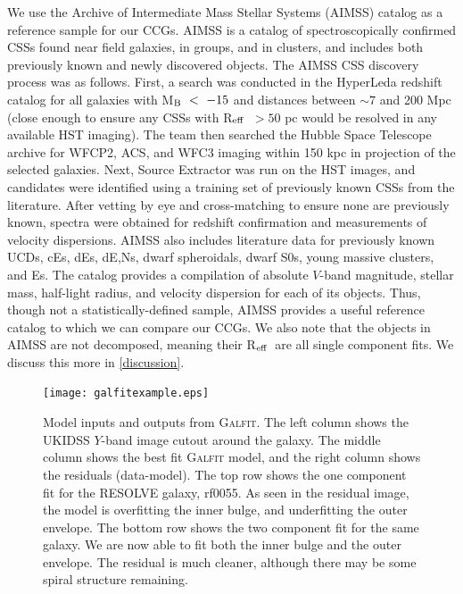 \documentclass[iop,apj]{emulateapj}
\newcommand{\Reff}{R$_{\rm eff}$}
\begin{document}
  We use the Archive of Intermediate Mass Stellar Systems (AIMSS) catalog \citep{Norris2014,Forbes2014,Janz2015} as a reference sample for our CCGs.  AIMSS is a catalog of spectroscopically confirmed CSSs found near field galaxies, in groups, and in clusters, and includes both previously known and newly discovered objects. The AIMSS CSS discovery process was as follows. First, a search was conducted in the HyperLeda redshift catalog \citep{Paturel2003} for all galaxies with M$_{\rm B}~<~-15$ and distances between $\sim 7$ and 200 Mpc (close enough to ensure any CSSs with \Reff\ $> 50$ pc would be resolved in any available HST imaging). The team then searched the Hubble Space Telescope archive for WFCP2, ACS, and WFC3 imaging within 150 kpc in projection of the selected galaxies. Next, Source Extractor was run on the HST images, and candidates were identified using a training set of previously known CSSs from the literature. After vetting by eye and cross-matching to ensure none are previously known, spectra were obtained for redshift confirmation and measurements of velocity dispersions. AIMSS also includes literature data for previously known UCDs, cEs, dEs, dE,Ns, dwarf spheroidals, dwarf S0s, young massive clusters, and Es. The catalog provides a compilation of absolute $V$-band magnitude, stellar mass, half-light radius, and velocity dispersion for each of its objects. Thus, though not a statistically-defined sample, AIMSS provides a useful reference catalog to which we can compare our CCGs. We also note that the objects in AIMSS are not decomposed, meaning their \Reff\ are all single component fits. We discuss this more in \autoref{discussion}.

\begin{figure}[b]
\begin{center}
\texttt{[image: galfitexample.eps]}
\caption{Model inputs and outputs from \textsc{Galfit}. The left column shows the UKIDSS $Y$-band image cutout around the galaxy. The middle column shows the best fit \textsc{Galfit} model, and the right column shows the residuals (data-model). The top row shows the one component fit for the RESOLVE galaxy, rf0055. As seen in the residual image, the model is overfitting the inner bulge, and underfitting the outer envelope. The bottom row shows the two component fit for the same galaxy. We are now  able to fit both the inner bulge and the outer envelope. The residual is much cleaner, although there may be some spiral structure remaining.}
\label{fig:galfit}
\end{center}
\end{figure}
\end{document}
